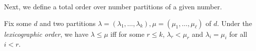 	Next, we define a total order over number partitions of a given number.
	\begin{fdef}
		Fix some $d$ and two partitions $\lambda = (\lambda_1,\ldots,\lambda_k),\mu = (\mu_1,\ldots,\mu_\ell)$ of $d$. Under the \emph{lexicographic order}, we have $\lambda \le \mu$ iff for some $r \le k$, $\lambda_r < \mu_r$ and $\lambda_i = \mu_i$ for all $i < r$.
	\end{fdef}